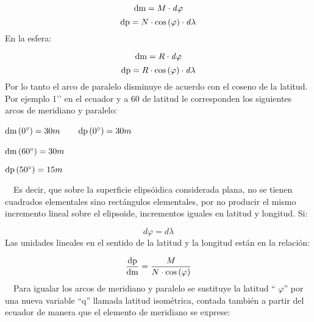 \documentclass{tufte-book}
\newcommand\normalsubformula[1]{\text{\mathversion{normal}$#1$}}
\begin{document}
\begin{equation*}
{\normalsubformula{\text{dm}}=M\cdot \mathit{d\varphi }}
\end{equation*}
\begin{equation*}
{\normalsubformula{\text{dp}}=N\cdot \text{cos}\left(\varphi
\right)\cdot \mathit{d\lambda }}
\end{equation*}
En la esfera:

\begin{equation*}
{\normalsubformula{\text{dm}}=R\cdot \mathit{d\varphi }}
\end{equation*}
\begin{equation*}
{\normalsubformula{\text{dp}}=R\cdot \text{cos}\left(\varphi
\right)\cdot \mathit{d\lambda }}
\end{equation*}
Por lo tanto el arco de paralelo disminuye de acuerdo con el coseno de
la latitud. Por ejemplo 1{\textquoteright}{\textquoteright} en el
ecuador y a 60{\textdegree} de latitud le corresponden los siguientes
arcos de meridiano y paralelo:


${\normalsubformula{\text{dm}}\left(0{}^{\circ}\right)=\text{30}m}$\ \ \ \ 
  ${\normalsubformula{\text{dp}}\left(0{}^{\circ}\right)=\text{30}m}$


${\normalsubformula{\text{dm}}\left(\text{60}{}^{\circ}\right)=\text{30}m}$\ \ \ \ 
 
${\normalsubformula{\text{dp}}\left(\text{50}{}^{\circ}\right)=\text{15}m}$

\ \ Es decir, que sobre la superficie elipsóidica considerada plana,
no se tienen cuadrados elementales sino rectángulos elementales, por
no producir el mismo incremento lineal sobre el elipsoide, incrementos
iguales en latitud y longitud. Si:

\begin{equation*}
{\mathit{d\varphi }=\mathit{d\lambda }}
\end{equation*}
Las unidades lineales en el sentido de la latitud y la longitud están
en la relación:

\begin{equation*}
{\frac{\normalsubformula{\text{dp}}}{\normalsubformula{\text{dm}}}=\frac{M}{N\cdot
\text{cos}\left(\varphi \right)}}
\end{equation*}
\ \ Para igualar los arcos de meridiano y paralelo se sustituye la
latitud {\textquotedblleft} ${\varphi }${\textquotedblright} por una
nueva variable {\textquotedblleft}q{\textquotedblright} llamada latitud
isométrica, contada también a partir del ecuador de manera que el
elemento de meridiano se exprese:
\end{document}
